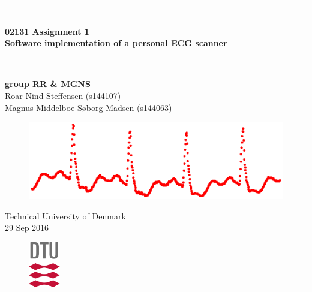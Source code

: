 \begin{titlepage}
\centering
\parindent=0pt
\newcommand{\HRule}{\rule{\textwidth}{1mm}}
 \HRule\\[1cm]\huge\textbf
{02131 Assignment 1 \\Software implementation of a personal ECG scanner}\\[0.1cm]
\HRule\\[3cm]\vspace{-1 cm} \textbf{\Large{group RR \& MGNS}}\\
\large{
Roar Nind Steffensen (s144107)\\
Magnus Middelboe Søborg-Madsen (s144063)}

\vspace{2 cm}

\vspace{0.5cm}
\begin{figure}[h]
\centering
\includegraphics[width=1.0\textwidth]{frontpage/frontpage.eps}
\label{fig:front}
\end{figure}

 \normalsize %
Technical University of Denmark\\
29 Sep 2016
\begin{figure}[h]
    \centering
    \includegraphics[height=2cm]{frontpage/DTUlogo.png}
\end{figure}
\end{titlepage}